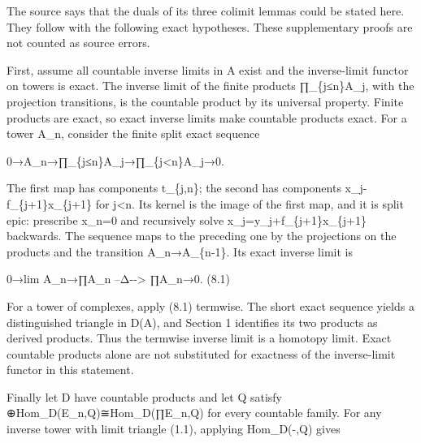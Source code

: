The source says that the duals of its three colimit lemmas could be stated here. They follow with the following exact hypotheses. These supplementary proofs are not counted as source errors.

First,\allowbreak{} assume all countable inverse limits in A exist and the inverse-limit functor on towers is exact. The inverse limit of the finite products ∏\_\allowbreak{}\{j≤n\}A\_\allowbreak{}j,\allowbreak{} with the projection transitions,\allowbreak{} is the countable product by its universal property. Finite products are exact,\allowbreak{} so exact inverse limits make countable products exact. For a tower A\_\allowbreak{}n,\allowbreak{} consider the finite split exact sequence

0\allowbreak{}→A\_\allowbreak{}n\allowbreak{}→∏\_\allowbreak{}\{j≤n\}A\_\allowbreak{}j\allowbreak{}→∏\_\allowbreak{}\{j<n\}A\_\allowbreak{}j\allowbreak{}→0.

The first map has components t\_\allowbreak{}\{j,\allowbreak{}n\}; the second has components x\_\allowbreak{}j-f\_\allowbreak{}\{j\allowbreak{}+1\}x\_\allowbreak{}\{j\allowbreak{}+1\} for j\textless n. Its kernel is the image of the first map,\allowbreak{} and it is split epic:\allowbreak{} prescribe x\_\allowbreak{}n\allowbreak{}=0 and recursively solve x\_\allowbreak{}j\allowbreak{}=y\_\allowbreak{}j\allowbreak{}+f\_\allowbreak{}\{j\allowbreak{}+1\}x\_\allowbreak{}\{j\allowbreak{}+1\} backwards. The sequence maps to the preceding one by the projections on the products and the transition A\_\allowbreak{}n\allowbreak{}→A\_\allowbreak{}\{n-1\}. Its exact inverse limit is

0\allowbreak{}→lim A\_\allowbreak{}n\allowbreak{}→∏A\_\allowbreak{}n --Δ-\allowbreak{}-> ∏A\_\allowbreak{}n\allowbreak{}→0. (8.1)\allowbreak{}

For a tower of complexes,\allowbreak{} apply (8.1)\allowbreak{} termwise. The short exact sequence yields a distinguished triangle in D(A)\allowbreak{},\allowbreak{} and Section 1 identifies its two products as derived products. Thus the termwise inverse limit is a homotopy limit. Exact countable products alone are not substituted for exactness of the inverse-limit functor in this statement.

Finally let D have countable products and let Q satisfy \allowbreak{}⊕Hom\_\allowbreak{}D(E\_\allowbreak{}n,\allowbreak{}Q)\allowbreak{}≅Hom\_\allowbreak{}D(∏E\_\allowbreak{}n,\allowbreak{}Q)\allowbreak{} for every countable family. For any inverse tower with limit triangle (1.1)\allowbreak{},\allowbreak{} applying Hom\_\allowbreak{}D(-,\allowbreak{}Q)\allowbreak{} gives

